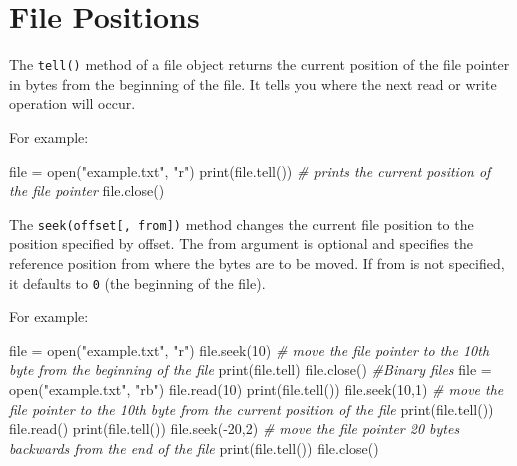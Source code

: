 \documentclass[11pt]{article}
\newenvironment{Shaded}{}{}
\newcommand{\DecValTok}[1]{\textcolor[rgb]{0.25,0.63,0.44}{{#1}}}
\newcommand{\StringTok}[1]{\textcolor[rgb]{0.25,0.44,0.63}{{#1}}}
\newcommand{\CommentTok}[1]{\textcolor[rgb]{0.38,0.63,0.69}{\textit{{#1}}}}
\newcommand{\NormalTok}[1]{{#1}}
\newcommand{\OperatorTok}[1]{\textcolor[rgb]{0.40,0.40,0.40}{{#1}}}
\newcommand{\BuiltInTok}[1]{{#1}}
\begin{document}
    \hypertarget{file-positions}{%
\section{File Positions}\label{file-positions}}

The \texttt{tell()} method of a file object returns the current position
of the file pointer in bytes from the beginning of the file. It tells
you where the next read or write operation will occur.

For example:

\begin{Shaded}
\begin{Highlighting}[]
\BuiltInTok{file} \OperatorTok{=} \BuiltInTok{open}\NormalTok{(}\StringTok{"example.txt"}\NormalTok{, }\StringTok{"r"}\NormalTok{)}
\BuiltInTok{print}\NormalTok{(}\BuiltInTok{file}\NormalTok{.tell()) }\CommentTok{\# prints the current position of the file pointer}
\BuiltInTok{file}\NormalTok{.close()}
\end{Highlighting}
\end{Shaded}

The \texttt{seek(offset{[},\ from{]})} method changes the current file
position to the position specified by offset. The from argument is
optional and specifies the reference position from where the bytes are
to be moved. If from is not specified, it defaults to \texttt{0} (the
beginning of the file).

For example:

\begin{Shaded}
\begin{Highlighting}[]

\BuiltInTok{file} \OperatorTok{=} \BuiltInTok{open}\NormalTok{(}\StringTok{"example.txt"}\NormalTok{, }\StringTok{"r"}\NormalTok{)}
\BuiltInTok{file}\NormalTok{.seek(}\DecValTok{10}\NormalTok{) }\CommentTok{\# move the file pointer to the 10th byte from the beginning of the file}
\BuiltInTok{print}\NormalTok{(}\BuiltInTok{file}\NormalTok{.tell)}
\BuiltInTok{file}\NormalTok{.close()}
\CommentTok{\#Binary files}
\BuiltInTok{file} \OperatorTok{=} \BuiltInTok{open}\NormalTok{(}\StringTok{"example.txt"}\NormalTok{, }\StringTok{"rb"}\NormalTok{)}
\BuiltInTok{file}\NormalTok{.read(}\DecValTok{10}\NormalTok{)}
\BuiltInTok{print}\NormalTok{(}\BuiltInTok{file}\NormalTok{.tell())}
\BuiltInTok{file}\NormalTok{.seek(}\DecValTok{10}\NormalTok{,}\DecValTok{1}\NormalTok{) }\CommentTok{\# move the file pointer to the 10th byte from the current position of the file}
\BuiltInTok{print}\NormalTok{(}\BuiltInTok{file}\NormalTok{.tell())}
\BuiltInTok{file}\NormalTok{.read()}
\BuiltInTok{print}\NormalTok{(}\BuiltInTok{file}\NormalTok{.tell())}
\BuiltInTok{file}\NormalTok{.seek(}\OperatorTok{{-}}\DecValTok{20}\NormalTok{,}\DecValTok{2}\NormalTok{) }\CommentTok{\# move the file pointer 20 bytes backwards from the end of the file}
\BuiltInTok{print}\NormalTok{(}\BuiltInTok{file}\NormalTok{.tell())}
\BuiltInTok{file}\NormalTok{.close()}
\end{Highlighting}
\end{Shaded}
\end{document}
